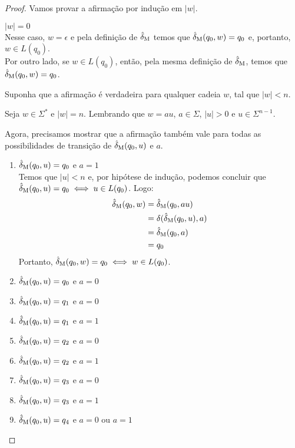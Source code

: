 \begin{proof} Vamos provar a afirmação por indução em $|w|$.

\indbase $|w| = 0$\\[3pt]
Nesse caso, $w = \epsilon$ e pela definição de $\operatorname{\hat{\delta}_M}$ temos que $\operatorname{\hat{\delta}_M}(q_0, w) = q_0$ e, portanto, $w \in L(q_0)$.\\
Por outro lado, se $w \in L(q_0)$, então, pela mesma definição de $\operatorname{\hat{\delta}_M}$, temos que $\operatorname{\hat{\delta}_M}(q_0, w) = q_0$.

\indhypo Suponha que a afirmação é verdadeira para qualquer cadeia $w$, tal que $|w| < n$.

\indstep Seja $w \in \Sigma^*$ e $|w| = n$. Lembrando que $w = au$, $a \in \Sigma$, $|u| > 0$ e $u \in \Sigma^{n - 1}$.

Agora, precisamos mostrar que a afirmação também vale para todas as possibilidades de transição de $\operatorname{\hat{\delta}_M}(q_0, u)$ e $a$.

\begin{enumerate}[label=\textbf{(\arabic*)}]
\item $\operatorname{\hat{\delta}_M}(q_0, u) = q_0$ e $a = 1$\\
Temos que $|u| < n$ e, por hipótese de indução, podemos concluir que $\operatorname{\hat{\delta}_M}(q_0, u) = q_0 \iff u \in L(q_0)$. Logo:
\begin{align*}
    \operatorname{\hat{\delta}_M}(q_0, w) &= \operatorname{\hat{\delta}_M}(q_0, au)\\
                    &= \delta(\operatorname{\hat{\delta}_M}(q_0, u), a)\\
                    &= \operatorname{\hat{\delta}_M}(q_0, a)\\
                    &= q_0
\end{align*}
Portanto, $\operatorname{\hat{\delta}_M}(q_0, w) = q_0 \iff w \in L(q_0)$.

\item $\operatorname{\hat{\delta}_M}(q_0, u) = q_0$ e $a = 0$
\item $\operatorname{\hat{\delta}_M}(q_0, u) = q_1$ e $a = 0$
\item $\operatorname{\hat{\delta}_M}(q_0, u) = q_1$ e $a = 1$
\item $\operatorname{\hat{\delta}_M}(q_0, u) = q_2$ e $a = 0$
\item $\operatorname{\hat{\delta}_M}(q_0, u) = q_2$ e $a = 1$
\item $\operatorname{\hat{\delta}_M}(q_0, u) = q_3$ e $a = 0$
\item $\operatorname{\hat{\delta}_M}(q_0, u) = q_3$ e $a = 1$
\item $\operatorname{\hat{\delta}_M}(q_0, u) = q_4$ e $a = 0$ ou $a = 1$
\end{enumerate}
\end{proof}
